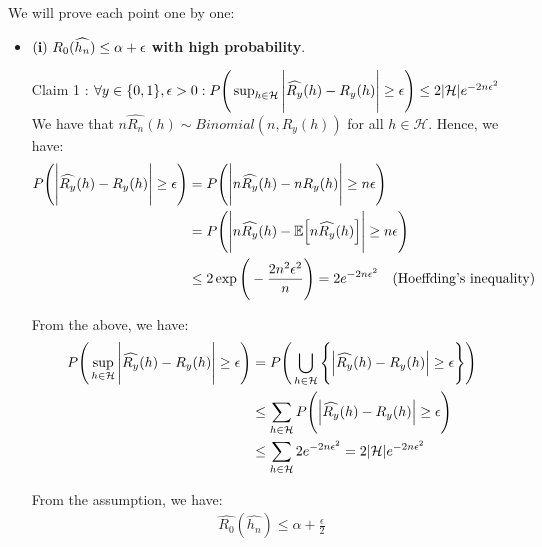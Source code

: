 \begin{solution*}
We will prove each point one by one:

\begin{itemize}
\item ${\bf (i)} \ R_0(\widehat{h_n}) \le \alpha + \epsilon$ \textbf{with high probability}. 

\begin{subproof}{\newline Claim 1 : $\forall y \in \{0,1\}, \epsilon>0 : P\Bigg(  \sup_{h\in\mathcal{H}} \Bigg|  \widehat{R_y}(h) - R_y(h)  \Bigg| \ge \epsilon  \Bigg) \le 2|\mathcal{H}|e^{-2n\epsilon^2}$}
    We have that $n\widehat{R_n}(h)\sim Binomial(n, R_y(h))$ for all $h\in\mathcal{H}$. Hence, we have:
    \begin{align*}
        P\Bigg( 
            \Bigg| \widehat{R_y}(h) - R_y(h) \Bigg| \ge \epsilon
         \Bigg)
        &= 
        P\Bigg( 
            \Bigg| n\widehat{R_y}(h) - nR_y(h) \Bigg| \ge n\epsilon
         \Bigg) \\
        &= 
        P\Bigg( 
            \Bigg| n\widehat{R_y}(h) - \mathbb{E}\Big[ n\widehat{R_y}(h) \Big] \Bigg| \ge n\epsilon
         \Bigg) \\
        &\le 
        2\exp\Bigg( 
            -\frac{2n^2\epsilon^2}{n}
         \Bigg) = 
        2e^{-2n\epsilon^2} \ \ \ (\text{Hoeffding's inequality})
    \end{align*}

    \noindent From the above, we have:
    \begin{align*}
        P\Bigg( 
            \sup_{h\in\mathcal{H}} \Bigg| 
                \widehat{R_y}(h) - R_y(h)
             \Bigg| \ge \epsilon
         \Bigg) 
        &= 
        P\Bigg( 
            \bigcup_{h\in\mathcal{H}} \Bigg\{  \Big| 
                \widehat{R_y}(h) - R_y(h)
             \Big| \ge \epsilon
         \Bigg\}  \Bigg) \\
        &\le 
        \sum_{h\in\mathcal{H}} P\Bigg(  
            \Big| 
                \widehat{R_y}(h) - R_y(h)
             \Big| \ge \epsilon
         \Bigg) \\
        &\le
        \sum_{h\in\mathcal{H}} 2e^{-2n\epsilon^2} = 2|\mathcal{H}|e^{-2n\epsilon^2}
    \end{align*}
\end{subproof}

\noindent\newline From the assumption, we have:
\begin{align*}
    \widehat{R_0}(\widehat{h_n}) \le \alpha + \frac{\epsilon}{2}
\end{align*}


\end{itemize}
\end{solution*}
